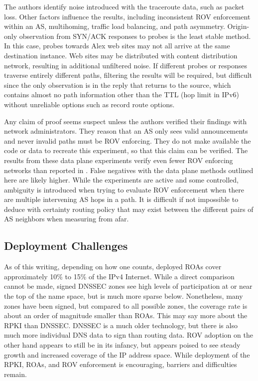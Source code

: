 \documentclass[sigconf]{acmart}
\begin{document}
The authors identify noise introduced with the traceroute data, such as
packet loss.  Other factors influence the results, including
inconsistent ROV enforcement within an AS, multihoming, traffic load
balancing, and path asymmetry.  Origin-only observation from SYN/ACK
responses to probes is the least stable method.  In this case, probes
towards Alex web sites may not all arrive at the same destination
instance.  Web sites may be distributed with content distribution
network, resulting in additional unfiltered noise.  If different probes
or responses traverse entirely different paths, filtering the results
will be required, but difficult since the only observation is in the
reply that returns to the source, which contains almost no path
information other than the TTL (hop limit in IPv6) without unreliable
options such as record route options.

Any claim of proof seems suspect unless the authors verified their
findings with network administrators.  They reason that an AS only sees
valid announcements and never invalid paths must be ROV enforcing.  They
do not make available the code or data to recreate this experiment, so
that this claim can be verified.  The results from these data plane
experiments verify even fewer ROV enforcing networks than reported in
\cite{reuter_towards_2018}.  False negatives with the data plane methods
outlined here are likely higher.  While the experiments are active and
some controlled, ambiguity is introduced when trying to evaluate ROV
enforcement when there are multiple intervening AS hops in a path.  It
is difficult if not impossible to deduce with certainty routing policy
that may exist between the different pairs of AS neighbors when
measuring from afar.

\subsection{Deployment Challenges}

As of this writing, depending on how one counts, deployed ROAs cover
approximately 10\% to 15\% of the IPv4 Internet.  While a direct
comparison cannot be made, signed DNSSEC zones see high levels of
participation at or near the top of the name space, but is much more
sparse below.  Nonetheless, many zones have been signed, but compared to
all possible zones, the coverage rate is about an order of magnitude
smaller than ROAs.  This may say more about the RPKI than DNSSEC.
DNSSEC is a much older technology, but there is also much more
individual DNS data to sign than routing data.  ROV adoption on the
other hand appears to still be in its infancy, but appears poised to see
steady growth and increased coverage of the IP address space.  While
deployment of the RPKI, ROAs, and ROV enforcement is encouraging,
barriers and difficulties remain.
\end{document}
